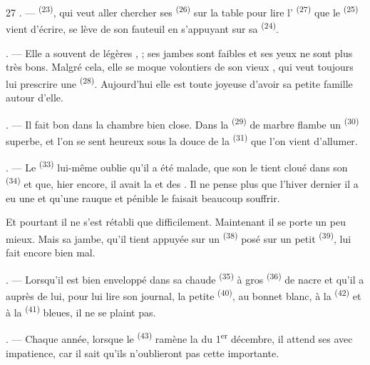 \begin{VUpage}[29]{27}
. ---  \textsuperscript{(23)}, qui veut aller chercher\nl
ses  \textsuperscript{(26)} sur la table pour lire l'\cc
{} \textsuperscript{(27)} que le  \textsuperscript{(25)} vient d'écrire, se lève\nl
de son fauteuil en s'appuyant sur sa  \textsuperscript{(24)}.

. --- Elle a souvent de légères ,\nl
{}; ses jambes\nl
sont faibles et ses yeux ne sont plus très bons. Malgré\nl
cela, elle se moque volontiers de son vieux ,\nl
qui veut toujours lui prescrire une  \textsuperscript{(28)}.\nl
Aujourd'hui elle est toute joyeuse d'avoir sa petite\nl
famille autour d'elle.

. --- Il fait bon dans la chambre bien close. Dans la\nl
{} \textsuperscript{(29)} de marbre flambe un  \textsuperscript{(30)} superbe,\nl
et l'on se sent heureux sous la douce  de la\nl
{} \textsuperscript{(31)} que l'on vient d'allumer.

. --- Le  \textsuperscript{(33)} lui-même oublie qu'il a\nl
été malade, que son  le tient cloué dans\nl
son  \textsuperscript{(34)} et que, hier encore, il avait la\nl
{} et des . Il ne pense plus que\nl
l'hiver dernier il a eu une  et\nl
qu'une  rauque et pénible le faisait beaucoup\nl
souffrir.

Et pourtant il ne s'est rétabli que difficilement.\nl
Maintenant il se porte un peu mieux. Mais sa jambe,\nl
qu'il tient appuyée sur un  \textsuperscript{(38)} posé sur un\nl
petit  \textsuperscript{(39)}, lui fait encore bien mal.

. --- Lorsqu'il est bien enveloppé dans sa chaude\nl
{} \textsuperscript{(35)} à gros  \textsuperscript{(36)} de nacre\nl
et qu'il a auprès de lui, pour lui lire son journal,\nl
la petite  \textsuperscript{(40)}, au bonnet blanc, à la\nl
{} \textsuperscript{(42)} et à la  \textsuperscript{(41)} bleues, il ne se\nl
plaint pas.

. --- Chaque année, lorsque le  \textsuperscript{(43)}\nl
ramène la  du 1\textsuperscript{er} décembre, il attend ses\nl
{} avec impatience, car il sait qu'ils\nl
n'oublieront pas cette  importante.
\end{VUpage}

